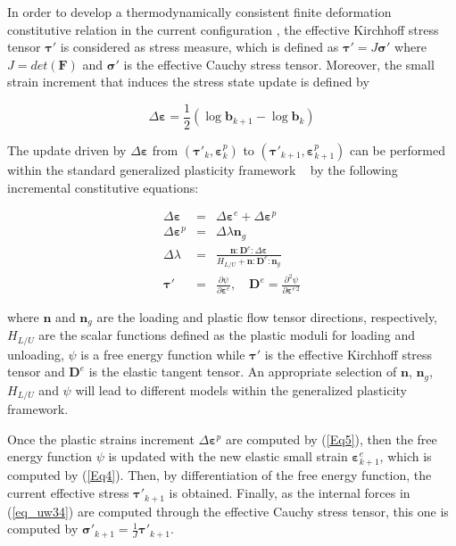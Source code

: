 \documentclass[preprint,12pt,a4paper]{elsarticle}
\begin{document}
In order to develop a thermodynamically consistent finite deformation constitutive relation in the current configuration \cite{Borja1998}, the effective Kirchhoff stress tensor $\boldsymbol{\tau}'$ is considered as stress measure, which is defined as $\boldsymbol{\tau}'=J \boldsymbol{\sigma}'$ where $J=det(\mathbf{F})$ and $\boldsymbol{\sigma}'$ is the effective Cauchy stress tensor. Moreover, the small strain increment that induces the stress state update is defined by 

\begin{equation}
\Delta \boldsymbol{\varepsilon}= \frac{1}{2} (\log\mathbf{b}_{k+1}-\log\mathbf{b}_{k})  
\end{equation}\label{Eq_B_tr}

The update driven by $\Delta \boldsymbol{\varepsilon}$  from $( \boldsymbol{\tau}'_k, \boldsymbol{\varepsilon}^p_k)$ to $( \boldsymbol{\tau}'_{k+1}, \boldsymbol{\varepsilon}^p_{k+1})$ can be performed within the standard generalized plasticity framework ~\cite{Mira2009} by the following incremental constitutive equations:

\begin{eqnarray}
\Delta\boldsymbol{\varepsilon} &=& \Delta\boldsymbol{\varepsilon}^e+\Delta\boldsymbol{\varepsilon}^p\label{Eq4}\\ 
\Delta\boldsymbol{\varepsilon}^p &=& \Delta \lambda \boldsymbol{n}_g\label{Eq5}\\ 
\Delta \lambda &=& \frac{\boldsymbol{n}:\boldsymbol{D}^e: \Delta \boldsymbol{\varepsilon}}{H_{L/U}+\boldsymbol{n}:\boldsymbol{D}^e:\boldsymbol{n}_g}\label{Eq6}\\
\boldsymbol\tau' &=& \frac{\partial \psi}{\partial \boldsymbol{\varepsilon}^e}, \quad \boldsymbol{D}^e = \frac{\partial^2 \psi}{\partial \boldsymbol{\varepsilon}^{e \, 2}} \label{Eq7}
\end{eqnarray}

where $ \boldsymbol{n}$ and $ \boldsymbol{n}_g$ are the loading and plastic flow tensor directions, respectively, $H_{L/U}$ are the scalar functions defined as the plastic moduli for loading and unloading, $\psi$ is a free energy function while $\boldsymbol{\tau}'$ is the effective Kirchhoff stress tensor and $\boldsymbol{D}^e$ is the elastic tangent tensor. An appropriate selection of $ \boldsymbol{n}$, $ \boldsymbol{n}_g$, $H_{L/U}$ and $\psi$ will lead to different models within the generalized plasticity framework.

Once the plastic strains increment   $\Delta\boldsymbol{\varepsilon}^p$ are computed by (\ref{Eq5}), then the free energy function $\psi$ is updated with the new elastic small strain $\boldsymbol{\varepsilon}^e_{k+1}$, which is computed by (\ref{Eq4}). Then, by differentiation of the free energy function, the current effective stress $\boldsymbol{\tau}'_{k+1}$ is obtained. Finally, as the internal forces in (\ref{eq_uw34}) are computed through the effective Cauchy stress tensor, this one is computed by $\boldsymbol{\sigma}'_{k+1}= \frac{1}{J}\boldsymbol{\tau}'_{k+1}$.
\end{document}
